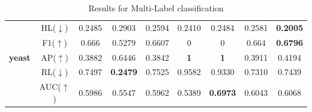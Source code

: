 \documentclass[12pt,a4paper,oneside,english]{report}
\begin{document}
\begin{table}
\begin{tabular}{|c|c|c|c|c|c|c|c|c|}
        ~ & HL($\downarrow$)  & 0.2485 & 0.2903 & 0.2594 & 0.2410 & 0.2484 & 0.2581 & \textbf{0.2005} \\
        ~ & F1($\uparrow$) & 0.666 & 0.5279 & 0.6607 &  0 & 0 & 0.664 & \textbf{0.6796} \\
        \textbf{yeast} & AP($\uparrow$) & 0.3882 & 0.6446 & 0.3842  &  \textbf{1} & \textbf{1} & 0.3911 & 0.4194 \\
        ~ & RL($\downarrow$)  & 0.7497 & \textbf{0.2479} & 0.7525 & 0.9582 & 0.9330 & 0.7310 & 0.7439 \\
        ~ & AUC($\uparrow$) & 0.5986 & 0.5547 & 0.5962 & 0.5389 & \textbf{0.6973} & 0.6043 & 0.6068 \\ 
        \hline
    \end{tabular}
    \caption{Results for Multi-Label classification }
\end{table}
\end{document}
